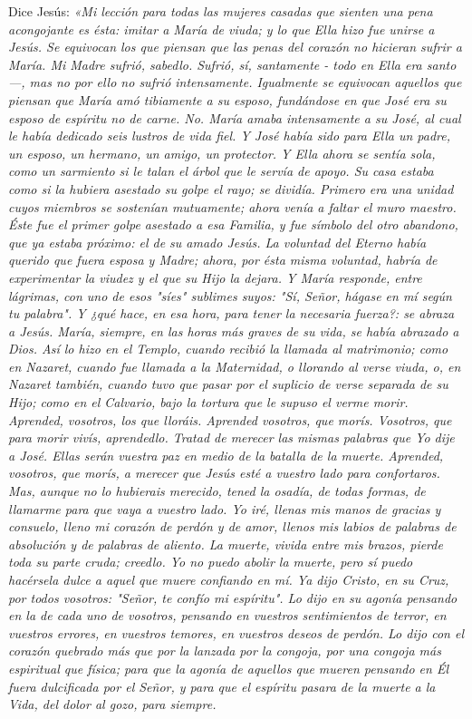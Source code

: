 \documentclass[12pt, twoside, openright]{book} %
\begin{document}
Dice Jesús: 
\emph{«Mi lección para todas las mujeres casadas que sienten una pena acongojante es ésta: imitar a María de viuda; y lo que Ella hizo fue unirse a Jesús. Se equivocan los que piensan que las penas del corazón no hicieran sufrir a María. Mi Madre sufrió, sabedlo. Sufrió, sí, santamente - todo en Ella era santo —, mas no por ello no sufrió intensamente. Igualmente se equivocan aquellos que piensan que María amó tibiamente a su esposo, fundándose en que José era su esposo de espíritu no de carne. No. María amaba intensamente a su José, al cual le había dedicado seis lustros de vida fiel. Y José había sido para Ella un padre, un esposo, un hermano, un amigo, un protector. Y Ella ahora se sentía sola, como un sarmiento si le talan el árbol que le servía de apoyo. Su casa estaba como si la hubiera asestado su golpe el rayo; se dividía. Primero era una unidad cuyos miembros se sostenían mutuamente; ahora venía a faltar el muro maestro. Éste fue el primer golpe asestado a esa Familia, y fue símbolo del otro abandono, que ya estaba próximo: el de su amado Jesús. La voluntad del Eterno había querido que fuera esposa y Madre; ahora, por ésta misma voluntad, habría de experimentar la viudez y el que su Hijo la dejara. Y María responde, entre lágrimas, con uno de esos "síes" sublimes suyos: "Sí, Señor, hágase en mí según tu palabra". Y ¿qué hace, en esa hora, para tener la necesaria fuerza?: se abraza a Jesús. María, siempre, en las horas más graves de su vida, se había abrazado a Dios. Así lo hizo en el Templo, cuando recibió la llamada al matrimonio; como en Nazaret, cuando fue llamada a la Maternidad, o llorando al verse viuda, o, en Nazaret también, cuando tuvo que pasar por el suplicio de verse separada de su Hijo; como en el Calvario, bajo la tortura que le supuso el verme morir. Aprended, vosotros, los que lloráis. Aprended vosotros, que morís. Vosotros, que para morir vivís, aprendedlo. Tratad de merecer las mismas palabras que Yo dije a José. Ellas serán vuestra paz en medio de la batalla de la muerte. Aprended, vosotros, que morís, a merecer que Jesús esté a vuestro lado para confortaros. Mas, aunque no lo hubierais merecido, tened la osadía, de todas formas, de llamarme para que vaya a vuestro lado. Yo iré, llenas mis manos de gracias y consuelo, lleno mi corazón de perdón y de amor, llenos mis labios de palabras de absolución y de palabras de aliento. La muerte, vivida entre mis brazos, pierde toda su parte cruda; creedlo. Yo no puedo abolir la muerte, pero sí puedo hacérsela dulce a aquel que muere confiando en mí. Ya dijo Cristo, en su Cruz, por todos vosotros: "Señor, te confío mi espíritu". Lo dijo en su agonía pensando en la de cada uno de vosotros, pensando en vuestros sentimientos de terror, en vuestros errores, en vuestros temores, en vuestros deseos de perdón. Lo dijo con el corazón quebrado más que por la lanzada por la congoja, por una congoja más espiritual que física; para que la agonía de aquellos que mueren pensando en Él fuera dulcificada por el Señor, y para que el espíritu pasara de la muerte a la Vida, del dolor al gozo, para siempre. }
 
\end{document}

